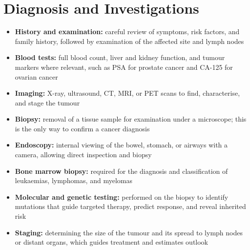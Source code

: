 \section*{Diagnosis and Investigations}
\begin{itemize}
    \item \textbf{History and examination:} careful review of symptoms, risk factors, and family history, followed by examination of the affected site and lymph nodes
    \item \textbf{Blood tests:} full blood count, liver and kidney function, and tumour markers where relevant, such as PSA for prostate cancer and CA-125 for ovarian cancer
    \item \textbf{Imaging:} X-ray, ultrasound, CT, MRI, or PET scans to find, characterise, and stage the tumour
    \item \textbf{Biopsy:} removal of a tissue sample for examination under a microscope; this is the only way to confirm a cancer diagnosis
    \item \textbf{Endoscopy:} internal viewing of the bowel, stomach, or airways with a camera, allowing direct inspection and biopsy
    \item \textbf{Bone marrow biopsy:} required for the diagnosis and classification of leukaemias, lymphomas, and myelomas
    \item \textbf{Molecular and genetic testing:} performed on the biopsy to identify mutations that guide targeted therapy, predict response, and reveal inherited risk
    \item \textbf{Staging:} determining the size of the tumour and its spread to lymph nodes or distant organs, which guides treatment and estimates outlook
\end{itemize}

